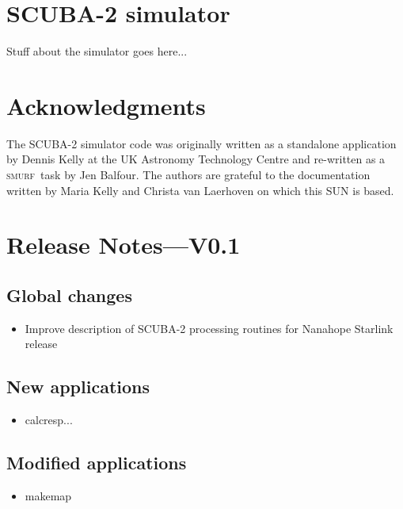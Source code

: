 \documentclass[twoside,11pt]{article}
\newcommand{\xlabel}[1]{}
\renewcommand{\_}{\texttt{\symbol{95}}}
\newcommand{\SMURF}{\textsc{smurf}}
\begin{document}
\section{\xlabel{simulator}SCUBA-2 simulator\label{se:sc2sim}}

Stuff about the simulator goes here...

\section{Acknowledgments}

The SCUBA-2 simulator code was originally written as a standalone
application by Dennis Kelly at the UK Astronomy Technology Centre and
re-written as a \SMURF\ task by Jen Balfour. The authors are grateful
to the documentation written by Maria Kelly and Christa van Laerhoven
on which this SUN is based.


\section{Release Notes---V0.1}

\subsection{Global changes}
\begin{itemize}
  \item Improve description of SCUBA-2 processing routines for Nanahope Starlink release
\end{itemize}

\subsection{New applications}
\begin{itemize}
  \item calcresp...
\end{itemize}

\subsection{Modified applications}
\begin{itemize}
  \item makemap
\end{itemize}
\end{document}
